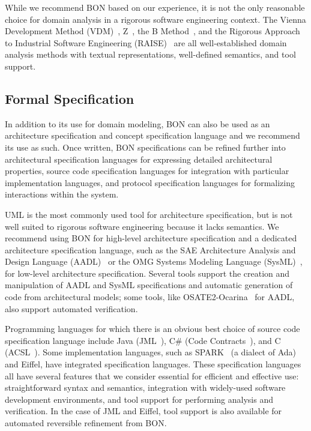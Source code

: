 While we recommend BON based on our experience, it is not the only
reasonable choice for domain analysis in a rigorous software
engineering context. The Vienna Development Method (VDM)~\cite{VDM},
Z~\cite{Zed}, the B Method~\cite{BMethod}, and the Rigorous Approach
to Industrial Software Engineering (RAISE)~\cite{RAISE} are all
well-established domain analysis methods with textual representations,
well-defined semantics, and tool support.

\subsection{Formal Specification}

In addition to its use for domain modeling, BON can also be used as an
architecture specification and concept specification language and we
recommend its use as such. Once written, BON specifications can be
refined further into architectural specification languages for
expressing detailed architectural properties, source code
specification languages for integration with particular implementation
languages, and protocol specification languages for formalizing
interactions within the system.

UML is the most commonly used tool for architecture specification, but
is not well suited to rigorous software engineering because it lacks
semantics. We recommend using BON for high-level architecture
specification and a dedicated architecture specification language,
such as the SAE Architecture Analysis and Design Language
(AADL)~\cite{AADL} or the OMG Systems Modeling Language
(SysML)~\cite{SysML}, for low-level architecture
specification. Several tools support the creation and manipulation of
AADL and SysML specifications and automatic generation of code from
architectural models; some tools, like
OSATE2-Ocarina~\cite{OSATE2-Ocarina} for AADL, also support automated
verification.

Programming languages for which there is an obvious best choice of
source code specification language include Java
(JML~\cite{JMLReferenceManual}), C\# (Code
Contracts~\cite{CodeContracts}), and C (ACSL~\cite{ACSL}). Some
implementation languages, such as SPARK~\cite{SPARK2014} (a dialect of
Ada) and Eiffel, have integrated specification languages. These
specification languages all have several features that we consider
essential for efficient and effective use: straightforward syntax and
semantics, integration with widely-used software development
environments, and tool support for performing analysis and
verification. In the case of JML and Eiffel, tool support is also
available for automated reversible refinement from BON.


